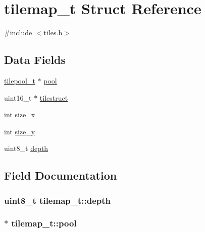 \hypertarget{structtilemap__t}{}\section{tilemap\+\_\+t Struct Reference}
\label{structtilemap__t}


{\ttfamily \#include $<$tiles.\+h$>$}

\subsection*{Data Fields}
\begin{DoxyCompactItemize}
\item 
\hyperlink{structtilepool__t}{tilepool\+\_\+t} $\ast$ \hyperlink{structtilemap__t_a4a251531ed02240ed1c0cbb50688cb14}{pool}
\item 
uint16\+\_\+t $\ast$ \hyperlink{structtilemap__t_aa8265d7200ace9d16f81dd5600958c34}{tilestruct}
\item 
int \hyperlink{structtilemap__t_a294a1064701b2f0d356919c24814a678}{size\+\_\+x}
\item 
int \hyperlink{structtilemap__t_a555e62b4a049be1c58a2bb7484bdf0c1}{size\+\_\+y}
\item 
uint8\+\_\+t \hyperlink{structtilemap__t_a567b661b0b1e30e9a84b25967b45db4b}{depth}
\end{DoxyCompactItemize}


\subsection{Field Documentation}
\subsubsection[{\texorpdfstring{depth}{depth}}]{\setlength{\rightskip}{0pt plus 5cm}uint8\+\_\+t tilemap\+\_\+t\+::depth}\hypertarget{structtilemap__t_a567b661b0b1e30e9a84b25967b45db4b}{}\label{structtilemap__t_a567b661b0b1e30e9a84b25967b45db4b}
\subsubsection[{\texorpdfstring{pool}{pool}}]{$\ast$ tilemap\+\_\+t\+::pool}\hypertarget{structtilemap__t_a4a251531ed02240ed1c0cbb50688cb14}{}\label{structtilemap__t_a4a251531ed02240ed1c0cbb50688cb14}
